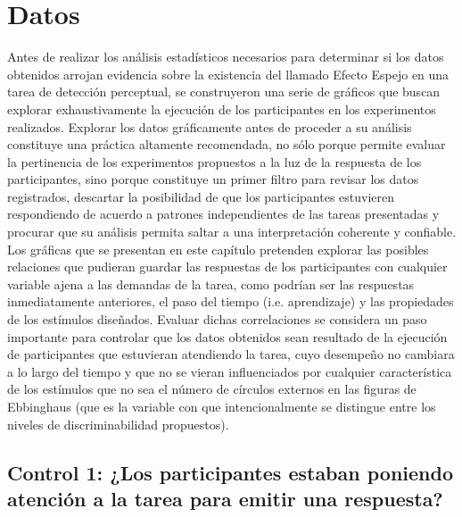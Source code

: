 
\chapter{Datos} %

\label{Cap_Data} %


Antes de realizar los análisis estadísticos necesarios para determinar si los datos obtenidos arrojan evidencia sobre la existencia del llamado Efecto Espejo en una tarea de detección perceptual, se construyeron una serie de gráficos que buscan explorar exhaustivamente la ejecución de los participantes en los experimentos realizados. Explorar los datos gráficamente antes de proceder a su análisis constituye una práctica altamente recomendada, no sólo porque permite evaluar la pertinencia de los experimentos propuestos a la luz de la respuesta de los participantes, sino porque constituye un primer filtro para revisar los datos registrados, descartar la posibilidad de que los participantes estuvieren respondiendo de acuerdo a patrones independientes de las tareas presentadas y procurar que su análisis permita saltar a una interpretación coherente y confiable.\\

Los gráficas que se presentan en este capítulo pretenden explorar las posibles relaciones que pudieran guardar las respuestas de los participantes con cualquier variable ajena a las demandas de la tarea, como podrían ser las respuestas inmediatamente anteriores, el paso del tiempo (i.e. aprendizaje) y las propiedades de los estímulos diseñados. Evaluar dichas correlaciones se considera un paso importante para controlar que los datos obtenidos sean resultado de la ejecución de participantes que estuvieran atendiendo la tarea, cuyo desempeño no cambiara a lo largo del tiempo y que no se vieran influenciados por cualquier característica de los estímulos que no sea el número de círculos externos en las figuras de Ebbinghaus (que es la variable con que intencionalmente se distingue entre los niveles de discriminabilidad propuestos).\\


\section{Control 1: ¿Los participantes estaban poniendo atención a la tarea para emitir una respuesta?}

